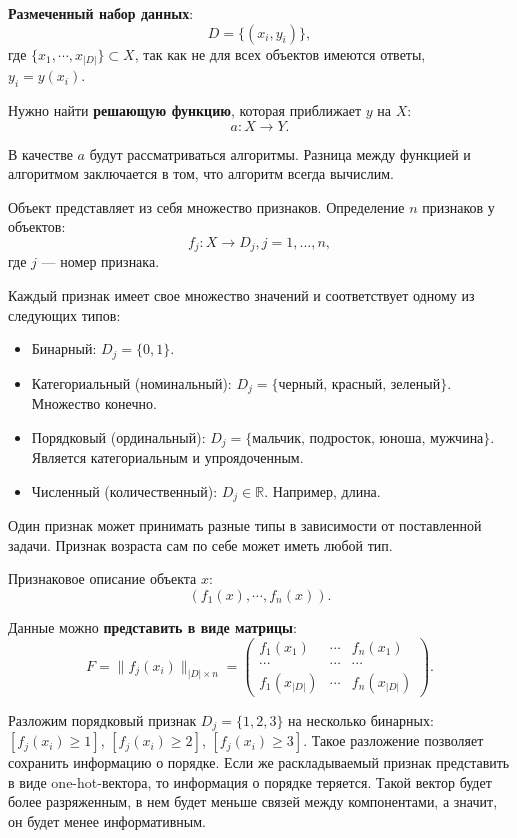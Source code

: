 \textbf{Размеченный набор данных}:
\[
D = \{(x_i, y_i)\},
\] где $\{x_1, \cdots, x_{|D|}\} \subset X$, так как не для всех объектов
имеются ответы,\\
$y_i = y(x_i)$.

Нужно найти \textbf{решающую функцию}, которая приближает $y$ на $X$:
\[
a : X \to Y.
\]

В качестве $a$ будут рассматриваться алгоритмы. Разница между функцией и
алгоритмом заключается в том, что алгоритм всегда вычислим.

Объект представляет из себя множество признаков. Определение $n$ признаков у
объектов:
\[
f_j : X \to D_j, j = 1, ..., n,
\] где $j$ --- номер признака.

Каждый признак имеет свое множество значений и соответствует одному из
следующих типов:
\begin{itemize}
    \item Бинарный: $D_j = \{0, 1\}$.
    \item Категориальный (номинальный): $D_j = \{\text{черный, красный,
        зеленый}\}$. Множество конечно.
    \item Порядковый (ординальный): $D_j = \{\text{мальчик, подросток, юноша,
        мужчина}\}$. Является категориальным и упроядоченным.
    \item Численный (количественный): $D_j \in \mathbb{R}$. Например, длина.
\end{itemize}

Один признак может принимать разные типы в зависимости от поставленной задачи.
Признак возраста сам по себе может иметь любой тип.

Признаковое описание объекта $x$:
\[
(f_1(x), \cdots, f_n(x)).
\]

Данные можно \textbf{представить в виде матрицы}:
\[
    F = \|f_j(x_i)\|_{|D|\times n} =
        \begin{pmatrix}
            f_1(x_1) & \cdots & f_n(x_1) \\
            \cdots & \cdots & \cdots \\
            f_1(x_{|D|}) & \cdots & f_n(x_{|D|})
        \end{pmatrix}
.\]

Разложим порядковый признак $D_j = \{ 1, 2, 3 \}$ на несколько бинарных:\\
$[f_j(x_i) \geq 1]$, $[f_j(x_i) \geq 2]$, $[f_j(x_i) \geq 3]$. Такое разложение
позволяет сохранить информацию о порядке. Если же раскладываемый признак
представить в виде one-hot-вектора, то информация о порядке теряется. Такой
вектор будет более разряженным, в нем будет меньше связей между компонентами,
а значит, он будет менее информативным.

